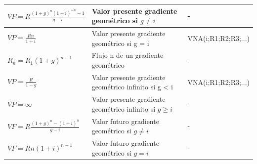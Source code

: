 \begin{center}
\begin{tabular}{ |p{6.8cm}|p{5cm}| p{3.2cm}|}
		$VP = R  \frac{(1 + g)^n (1 + i)^{-n}-1}{g - i} $ \hspace{35 pt}                                           & Valor presente gradiente geométrico si  $g \neq i$         &                           
		-                                                                                                                                                                                                   \\ \hline
		
		$VP = \frac{R n}{1 + i}$ \hspace{35 pt}                                                                    & Valor presente gradiente geométrico si g = i               & VNA(i;R1;R2;R3;...)       \\ \hline
		
		$R_{n} = R_{1}(1+g)^{n-1}$ \hspace{35 pt}                                                                  & Flujo n de un gradiente geométrico                         & -                         \\ \hline
		
		$VP = \frac{R}{1 - g} $ \hspace{35 pt}                                                                     & Valor presente gradiente geométrico infinito si g < i                                  
		                                                                                                           & VNA(i;R1;R2;R3;...)                                                                    \\ \hline
		
		$VP = \infty $ \hspace{35 pt}                                                                              & Valor presente gradiente geométrico infinito si $g \geq i$ & -                         \\ \hline
		
		
		$VF = R  \frac{(1 + g)^n - (1 + i)^n}{g - i} $                                                             & Valor futuro gradiente geométrico si $g \neq i$            & -                         \\ \hline
		
		$VF = Rn(1 + i)^{n-1} $                                                                                    & Valor futuro gradiente geométrico si $g = i$               & -                         \\ \hline
	\end{tabular}
\end{center}


